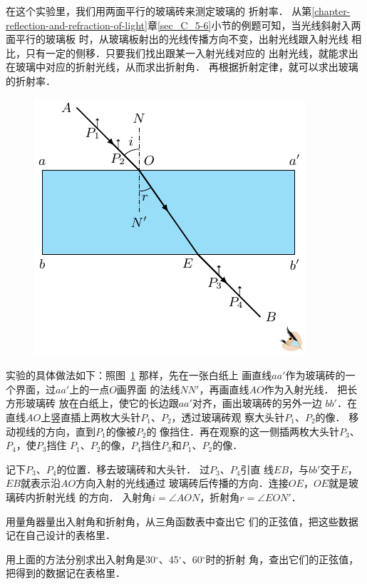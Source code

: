 在这个实验里，我们用两面平行的玻璃砖来测定玻璃的
折射率．
从第\ref{chapter-reflection-and-refraction-of-light}章\ref{sec_C_5-6}小节的例题可知，当光线斜射入两面平行的玻璃板
时，从玻璃板射出的光线传播方向不变，出射光线跟入射光线
相比，只有一定的侧移．只要我们找出跟某一入射光线对应的
出射光线，就能求出在玻璃中对应的折射光线，从而求出折射角．
再根据折射定律，就可以求出玻璃的折射率．
\begin{figure}[htbp]
    \centering
    \includegraphics{fig/C/10-7.pdf}
    \caption{}\label{fig_C_10-7}
\end{figure}

实验的具体做法如下：照图~\ref{fig_C_10-7} 那样，先在一张白纸上
画直线$aa'$作为玻璃砖的一个界面，过$aa'$上的一点$O$画界面
的法线$NN'$，再画直线$AO$作为入射光线．
把长方形玻璃砖
放在白纸上，使它的长边跟$aa'$对齐，画出玻璃砖的另外一边
$bb'$．在直线$AO$上竖直插上两枚大头针$P_1$、$P_2$，透过玻璃砖观
察大头针$P_1$、$P_2$的像．
移动视线的方向，直到$P_1$的像被$P_2$的
像挡住．再在观察的这一侧插两枚大头针$P_3$、$P_4$，使$P_3$挡住
$P_1$、$P_2$的像，$P_4$挡住$P_3$和$P_1$、$P_2$的像．


记下$P_3$、$P_4$的位置．移去玻璃砖和大头针．
过$P_3$、$P_4$引直
线$EB$，与$bb'$交于$E$，$EB$就表示沿$AO$方向入射的光线通过
玻璃砖后传播的方向．连接$OE$，$OE$就是玻璃砖内折射光线
的方向．
入射角$i=\angle AON$，折射角$r=\angle EON'$．

用量角器量出入射角和折射角，从三角函数表中查出它
们的正弦值，把这些数据记在自己设计的表格里．

用上面的方法分别求出入射角是30$^\circ$、45$^\circ$、60$^\circ$时的折射
角，查出它们的正弦值，把得到的数据记在表格里．

